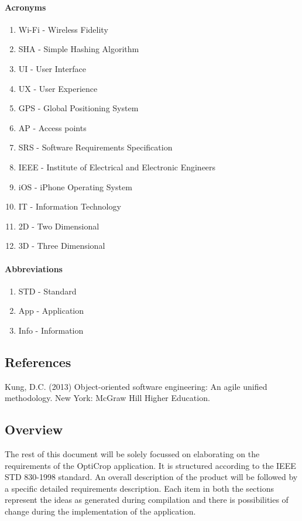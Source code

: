 \documentclass[runningheads,a4paper]{article}
\begin{document}
\paragraph{\textbf{Acronyms}}
\begin{enumerate}
	\item Wi-Fi - Wireless Fidelity 
	\item SHA - Simple Hashing Algorithm
	\item UI - User Interface
	\item UX - User Experience
	\item GPS - Global Positioning System
	\item AP - Access points
	\item SRS - Software Requirements Specification
	\item IEEE - Institute of Electrical and Electronic Engineers 
	\item iOS - iPhone Operating System 
	\item IT - Information Technology
	\item 2D - Two Dimensional
	\item 3D - Three Dimensional
\end{enumerate}

\paragraph{\textbf{Abbreviations}}
\begin{enumerate}
	\item STD - Standard
	\item App - Application
	\item Info - Information
\end{enumerate}

\subsection{References}
Kung, D.C. (2013) Object-oriented software engineering: An agile unified methodology. New York: McGraw Hill Higher Education.

\subsection{Overview}
The rest of this document will be solely focussed on elaborating on the requirements of the OptiCrop application. It is structured according to the IEEE STD 830-1998 standard. An overall description of the product will be followed by a specific detailed requirements description. Each item in both the sections represent the ideas as generated during compilation and there is possibilities of change during the implementation of the application.
\end{document}

